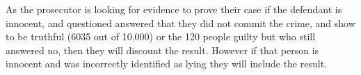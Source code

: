 As the prosecutor is looking for evidence to prove their case if the defendant is innocent, and questioned answered that they did not commit the crime, and show to be truthful (6035 out of 10,000) or the 120 people guilty but who still answered no, then they will discount the result.  However if that person is innocent and was incorrectly identified as lying they will include the result.









